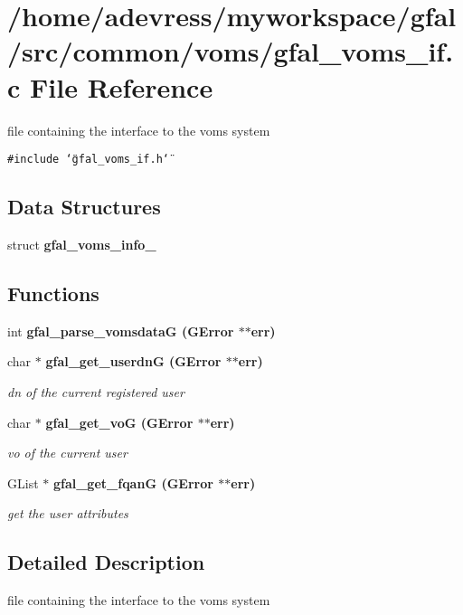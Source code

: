 \section{/home/adevress/myworkspace/gfal/src/common/voms/gfal\_\-voms\_\-if.c File Reference}
\label{gfal__voms__if_8c}
file containing the interface to the voms system 

{\tt \#include \char`\"{}gfal\_\-voms\_\-if.h\char`\"{}}\par
\subsection*{Data Structures}
\begin{CompactItemize}
\item 
struct \textbf{gfal\_\-voms\_\-info\_\-}
\end{CompactItemize}
\subsection*{Functions}
\begin{CompactItemize}
\item 
int \bf{gfal\_\-parse\_\-vomsdata\-G} (GError $\ast$$\ast$err)
\item 
char $\ast$ \bf{gfal\_\-get\_\-userdn\-G} (GError $\ast$$\ast$err)
\begin{CompactList}\small\item\em dn of the current registered user \item\end{CompactList}\item 
char $\ast$ \bf{gfal\_\-get\_\-vo\-G} (GError $\ast$$\ast$err)
\begin{CompactList}\small\item\em vo of the current user \item\end{CompactList}\item 
GList $\ast$ \bf{gfal\_\-get\_\-fqan\-G} (GError $\ast$$\ast$err)
\begin{CompactList}\small\item\em get the user attributes \item\end{CompactList}\end{CompactItemize}


\subsection{Detailed Description}
file containing the interface to the voms system 

